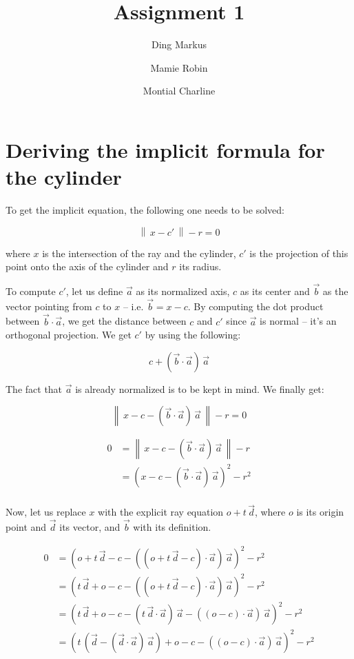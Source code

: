 \documentclass{article}
\title{{\Huge \textbf{Assignment 1}}}
\author{Ding Markus \and Mamie Robin \and Montial Charline}
\newcommand{\norm}[1]{\left\lVert\,#1\,\right\rVert}
\begin{document}
    \maketitle

    \section{Deriving the implicit formula for the cylinder}
    
    To get the implicit equation, the following one needs to be solved:
    
    \[ \norm{x - c'} - r = 0 \]
    
    where $x$ is the intersection of the ray and the cylinder, $c'$ is the projection of this point onto the axis of the cylinder and $r$ its radius.
    
    To compute $c'$, let us define $\vec{a}$ as its normalized axis, $c$ as its center and $\vec{b}$ as the vector pointing from $c$ to $x$ -- i.e. $\vec{b} = x - c$.
    By computing the dot product between $\vec{b} \cdot \vec{a}$, we get the distance between $c$ and $c'$ since $\vec{a}$ is normal -- it's an orthogonal projection.
    We get $c'$ by using the following:
    
    \[ c + (\vec{b} \cdot \vec{a}) \, \vec{a} \]
    
    The fact that $\vec{a}$ is already normalized is to be kept in mind.
    We finally get:
    
    \[ \norm{x - c - (\vec{b} \cdot \vec{a}) \, \vec{a}} - r = 0 \]
    
    \begin{align*}
        0 &= \norm{x - c - (\vec{b} \cdot \vec{a}) \, \vec{a}} - r\\
        &= \left(x - c - (\vec{b} \cdot \vec{a}) \, \vec{a}\right)^2 - r^2\\
    \end{align*}
    
    Now, let us replace $x$ with the explicit ray equation $o + t \, \vec{d}$, where $o$ is its origin point and $\vec{d}$ its vector, and $\vec{b}$ with its definition.
    
    \begin{align*}
        0 &= \left(o + t \, \vec{d} - c - ((o + t \, \vec{d} - c) \cdot \vec{a}) \, \vec{a}\right)^2 - r^2\\
        &= \left(t \, \vec{d} + o - c - ((o + t \, \vec{d} - c) \cdot \vec{a}) \, \vec{a}\right)^2 - r^2\\
        &= \left(t \, \vec{d} + o - c - (t \, \vec{d} \cdot \vec{a}) \, \vec{a} - ((o - c) \cdot \vec{a}) \, \vec{a}\right)^2 - r^2\\
        &= \left(t \, (\vec{d} - (\vec{d} \cdot \vec{a}) \, \vec{a}) + o - c - ((o - c) \cdot \vec{a}) \, \vec{a}\right)^2 - r^2
    \end{align*}
    
\end{document}
